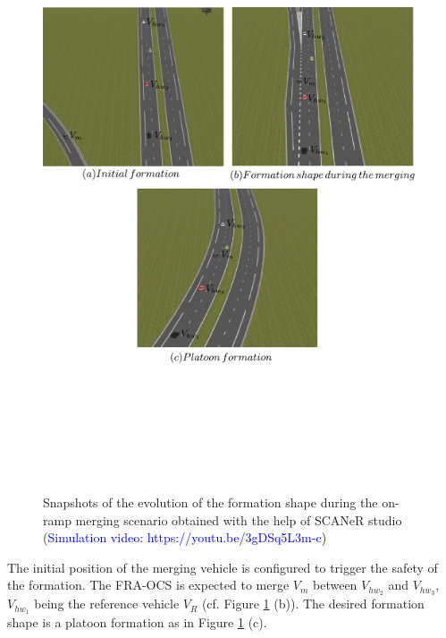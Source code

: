         \begin{figure}[!h]
        \centering 
        \includegraphics[width=11cm,height=18cm,keepaspectratio]{chapters/Chapitre_5/Figures/FRA-OCS/Formation_shape.pdf}
        \caption{Snapshots of the evolution of the formation shape during the on-ramp merging scenario obtained with the help of SCANeR studio (\textcolor{blue}{Simulation video: https://youtu.be/3gDSq5L3m-c})}
        \label{fig:FRA-OCS:formation_shape}
        \end{figure}






The initial position of the merging vehicle is configured to trigger the safety of the formation. The FRA-OCS is expected to merge $V_{m}$ between $V_{hw_2}$ and $V_{hw_3}$, $V_{hw_1}$ being the reference vehicle $V_R$ (cf. Figure \ref{fig:FRA-OCS:formation_shape} (b)). The desired formation shape is a platoon formation as in Figure \ref{fig:FRA-OCS:formation_shape} (c).




